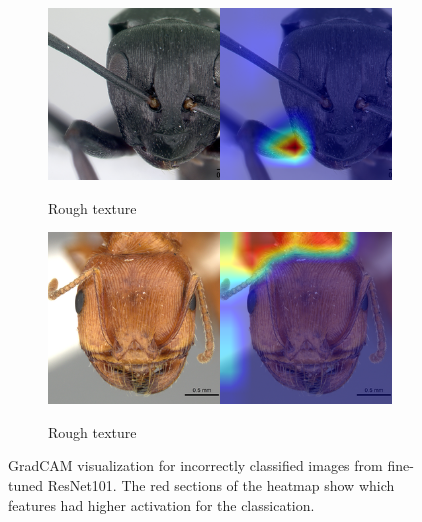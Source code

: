 \documentclass{aci}
\numberwithin{equation}{section}
\begin{document}
\begin{figure}
\begin{subfigure}{\subwidth}
        \label{fig:incorrect_nonideal_22}
    \end{subfigure}
    \begin{subfigure}{\subwidth}
        \caption*{Rough texture}
        \includegraphics[width=1\linewidth]{thesis_assets/gradcam/incorrect_nonideal/61.png}
        \label{fig:incorrect_nonideal_61}
    \end{subfigure}
    \begin{subfigure}{\subwidth}
        \caption*{Rough texture}
        \includegraphics[width=1\linewidth]{thesis_assets/gradcam/incorrect_nonideal/204.png}
        \label{fig:incorrect_nonideal_204}
    \end{subfigure}
    \caption{GradCAM visualization for incorrectly classified images from
        fine-tuned ResNet101. The red sections of the heatmap show which features
        had higher activation for the classication.}
    \label{fig:incorrect_images}
\end{figure}
\end{document}

